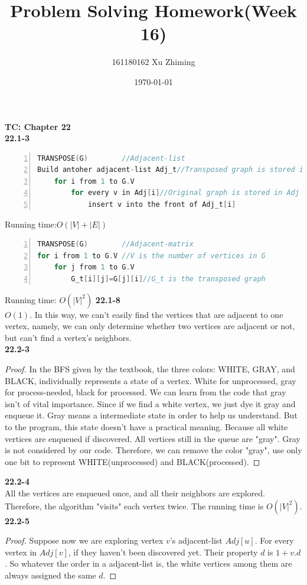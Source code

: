 \documentclass{article}
\begin{document}
\title{Problem Solving Homework(Week 16)}\author{161180162 Xu Zhiming}\date{\today}
\maketitle
\setlength\parindent{0em}\large\textbf{TC: Chapter 22}\\
\normalsize\textbf{22.1-3}\\
\begin{lstlisting}[language=C,numbers=left]
TRANSPOSE(G)		//Adjacent-list
Build antoher adjacent-list Adj_t//Transposed graph is stored in Adj_t
	for i from 1 to G.V
		for every v in Adj[i]//Original graph is stored in Adj 
			insert v into the front of Adj_t[i]
\end{lstlisting}
Running time:$O(|V|+|E|)$
\begin{lstlisting}[language=C,numbers=left]
TRANSPOSE(G)		//Adjacent-matrix
for i from 1 to G.V //V is the number of vertices in G
	for j from 1 to G.V
		G_t[i][j]=G[j][i]//G_t is the transposed graph
\end{lstlisting}
Running time: $O(|V|^2)$
\textbf{22.1-8}\\
$O(1)$. In this way, we can't easily find the vertices that are adjacent to one vertex, namely, we can only determine whether two vertices are adjacent or not, but can't find a vertex's neighbors.\\ 
\textbf{22.2-3}
\begin{proof}
In the BFS given by the textbook, the three colors: WHITE, GRAY, and BLACK, individually represents a state of a vertex. White for unprocessed, gray for process-needed, black for processed. We can learn from the code that gray isn't of vital importance. Since if we find a white vertex, we just dye it gray and enqueue it. Gray means a intermediate state in order to help us understand. But to the program, this state doesn't have a practical meaning. Because all white vertices are enqueued if discovered. All vertices still in the queue are "gray". Gray is not considered by our code. Therefore, we can remove the color "gray", use only one bit to represent WHITE(unprocessed) and BLACK(processed).
\end{proof}
\textbf{22.2-4}\\
All the vertices are enqueued once, and all their neighbors are explored. Therefore, the algorithm "visits" each vertex twice. The running time is $O(|V|^2)$.\\
\textbf{22.2-5}
\begin{proof}
Suppose now we are exploring vertex $v$'s adjacent-list $Adj[u]$. For every vertex in $Adj[v]$, if they haven't been discovered yet. Their property $d$ is $1+v.d$. So whatever the order in a adjacent-list is, the white vertices among them are always assigned the same $d$.  
\end{proof}
\end{document}
